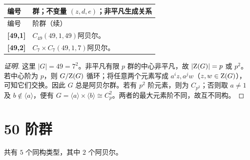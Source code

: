 \documentclass[UTF8,fontset=fandol,11pt,a4paper]{ctexart}
\begin{document}
\begin{longtable}{@{}p{17mm}>{\raggedright\arraybackslash}p{141mm}@{}}

\toprule 编号 & 群；不变量 $(z,d,e)$；非平凡生成关系\\\midrule\endfirsthead

\toprule 编号 & 49 阶群（续）\\\midrule\endhead\bottomrule\endfoot

\textbf{[49,1]} & $C_{49}$\quad $(49,1,49)$\quad 阿贝尔。\\[3pt]

\textbf{[49,2]} & $C_{7}\times C_{7}$\quad $(49,1,7)$\quad 阿贝尔。\\[3pt]

\end{longtable}\endgroup

\begin{proof}[证明]
这里 $|G|=49=7^2$。非平凡有限 $p$ 群的中心非平凡，故 $|\mathrm Z(G)|=p$ 或 $p^2$。若中心阶为 $p$，则 $G/\mathrm Z(G)$ 循环；将任意两个元素写成 $a^iz,a^jw$（$z,w\in\mathrm Z(G)$），可知它们交换。因此 $G$ 总是阿贝尔群。若有 $p^2$ 阶元素，则为 $C_{p^2}$；否则取 $a\ne1$ 及 $b\notin\langle a\rangle$，便有 $G=\langle a\rangle\times\langle b\rangle\cong C_p^2$。两者的最大元素阶不同，故互不同构。
\end{proof}

\section*{50 阶群}\label{order:50}

共有 $5$ 个同构类型，其中 $2$ 个阿贝尔。

\begingroup\small\setlength{\tabcolsep}{3pt}\renewcommand{\arraystretch}{1.12}
\end{document}

